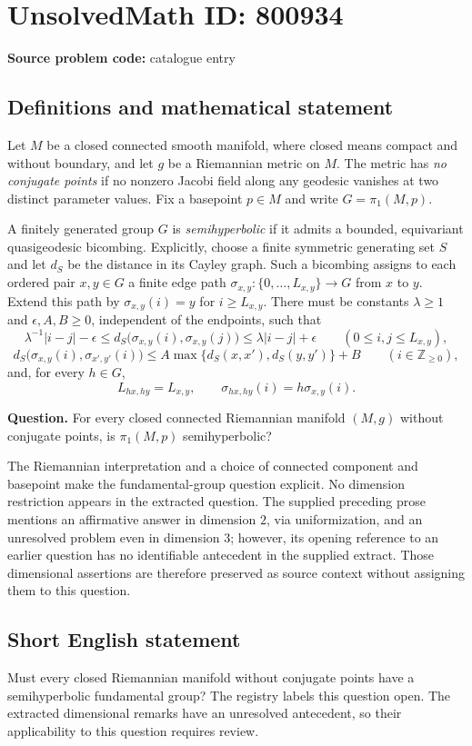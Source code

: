 \documentclass[11pt]{article}
\begin{document}
\section*{UnsolvedMath ID: 800934}
\textbf{Source problem code:} catalogue entry
\subsection{Definitions and mathematical statement}
Let \(M\) be a closed connected smooth manifold, where closed means compact and without boundary, and let \(g\) be a Riemannian metric on \(M\). The metric has \emph{no conjugate points} if no nonzero Jacobi field along any geodesic vanishes at two distinct parameter values. Fix a basepoint \(p\in M\) and write \(G=\pi_1(M,p)\).

A finitely generated group \(G\) is \emph{semihyperbolic} if it admits a bounded, equivariant quasigeodesic bicombing. Explicitly, choose a finite symmetric generating set \(S\) and let \(d_S\) be the distance in its Cayley graph. Such a bicombing assigns to each ordered pair \(x,y\in G\) a finite edge path \(\sigma_{x,y}\colon\{0,\ldots,L_{x,y}\}\to G\) from \(x\) to \(y\). Extend this path by \(\sigma_{x,y}(i)=y\) for \(i\ge L_{x,y}\). There must be constants \(\lambda\ge1\) and \(\epsilon,A,B\ge0\), independent of the endpoints, such that
\[
\lambda^{-1}|i-j|-\epsilon
\le d_S\bigl(\sigma_{x,y}(i),\sigma_{x,y}(j)\bigr)
\le \lambda|i-j|+\epsilon
\qquad(0\le i,j\le L_{x,y}),
\]
\[
d_S\bigl(\sigma_{x,y}(i),\sigma_{x',y'}(i)\bigr)
\le A\max\{d_S(x,x'),d_S(y,y')\}+B
\qquad(i\in\mathbb Z_{\ge0}),
\]
and, for every \(h\in G\),
\[
L_{hx,hy}=L_{x,y},\qquad
\sigma_{hx,hy}(i)=h\sigma_{x,y}(i).
\]

\textbf{Question.} For every closed connected Riemannian manifold \((M,g)\) without conjugate points, is \(\pi_1(M,p)\) semihyperbolic?

The Riemannian interpretation and a choice of connected component and basepoint make the fundamental-group question explicit. No dimension restriction appears in the extracted question. The supplied preceding prose mentions an affirmative answer in dimension \(2\), via uniformization, and an unresolved problem even in dimension \(3\); however, its opening reference to an earlier question has no identifiable antecedent in the supplied extract. Those dimensional assertions are therefore preserved as source context without assigning them to this question.
\subsection{Short English statement}
Must every closed Riemannian manifold without conjugate points have a semihyperbolic fundamental group? The registry labels this question open. The extracted dimensional remarks have an unresolved antecedent, so their applicability to this question requires review.
\end{document}
